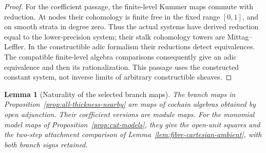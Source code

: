 \documentclass[11pt]{article}
\newtheorem{lemma}[theorem]{Lemma}
\theoremstyle{definition}
\theoremstyle{remark}
\begin{document}
\begin{proof}
For the coefficient passage, the finite-level Kummer maps commute
with reduction.  At nodes their cohomology is finite free in the
fixed range $[0,1]$, and on smooth strata in degree zero.  Thus the
actual systems have derived reduction equal to the lower-precision
system; their stalk cohomology towers are Mittag--Leffler.  In the
constructible adic formalism their reductions detect equivalences.
The compatible finite-level algebra comparisons consequently give
an adic equivalence and then its rationalization.  This passage uses
the constructed constant system, not inverse limits of arbitrary
constructible sheaves.
\end{proof}

\begin{lemma}[Naturality of the selected branch maps]
\label{lem:branch-map-naturality}
The branch maps in Proposition~\ref{prop:all-thickness-nearby} are
maps of cochain algebras obtained by open adjunction.  Their
coefficient versions are module maps.  For the monomial model maps
of Proposition~\ref{prop:cut-models}, they give the open-unit squares
and the two-step attachment comparison of
Lemma~\ref{lem:fibre-cartesian-ambient}, with both branch signs retained.
\end{lemma}
\end{document}
